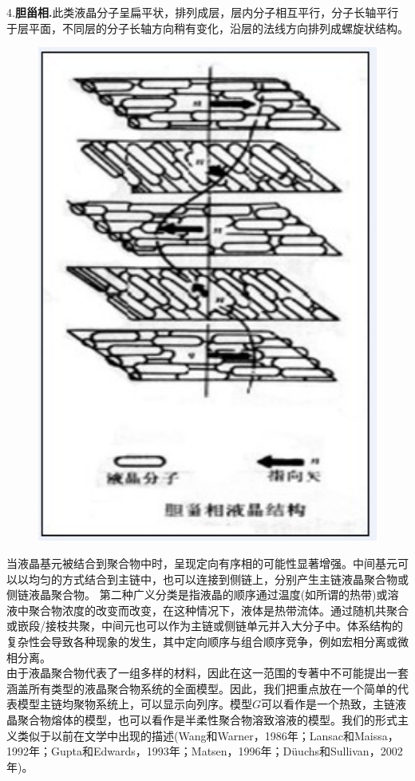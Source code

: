 4.\textbf{胆甾相.}此类液晶分子呈扁平状，排列成层，层内分子相互平行，分子长轴平行于层平面，不同层的分子长轴方向稍有变化，沿层的法线方向排列成螺旋状结构。\\
\begin{figure}[H]
	\centering   
	\includegraphics[width=12cm]{./figures/5.png}
\end{figure}

当液晶基元被结合到聚合物中时，呈现定向有序相的可能性显著增强。中间基元可以以均匀的方式结合到主链中，也可以连接到侧链上，分别产生主链液晶聚合物或侧链液晶聚合物。 第二种广义分类是指液晶的顺序通过温度(如所谓的热带)或溶液中聚合物浓度的改变而改变，在这种情况下，液体是热带流体。通过随机共聚合或嵌段/接枝共聚，中间元也可以作为主链或侧链单元并入大分子中。体系结构的复杂性会导致各种现象的发生，其中定向顺序与组合顺序竞争，例如宏相分离或微相分离。\\

由于液晶聚合物代表了一组多样的材料，因此在这一范围的专著中不可能提出一套涵盖所有类型的液晶聚合物系统的全面模型。因此，我们把重点放在一个简单的代表模型主链均聚物系统上，可以显示向列序。模型$G$可以看作是一个热致，主链液晶聚合物熔体的模型，也可以看作是半柔性聚合物溶致溶液的模型。我们的形式主义类似于以前在文学中出现的描述(Wang和Warner，1986年；Lansac和Maissa，1992年；Gupta和Edwards，1993年；Matsen，1996年；Düuchs和Sullivan，2002年)。\\


